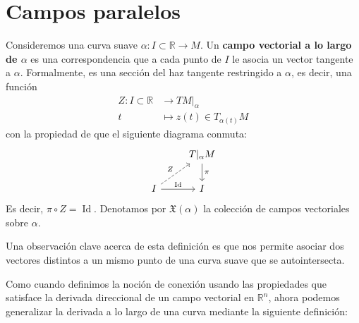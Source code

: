 \documentclass[spanish]{book}
\theoremstyle{definition}
\newcommand{\R}{\mathbb{R}}
\newcommand{\X}{\mathfrak{X}}
\DeclareMathOperator{\Id}{Id}
\begin{document}
	\section{Campos paralelos}
	Consideremos una curva suave $\alpha:I\subset\R\to M$. Un \textbf{campo vectorial a lo largo de $\alpha$} es una correspondencia que a cada punto de $I$ le asocia un vector tangente a $\alpha$. Formalmente, es una sección del haz tangente restringido a $\alpha$, es decir, una función
	\begin{align*}
		Z:I\subset\R&\to TM|_{\alpha}\\
		t&\mapsto z(t)\in T_{\alpha(t)}M
	\end{align*}
	con la propiedad de que el siguiente diagrama conmuta:
	\[\begin{tikzcd}
		&T|_{\alpha}M\arrow{d}{\pi}\\
		I\arrow{r}{\Id}\arrow[dashed]{ur}{Z}&I
	\end{tikzcd}\]
	Es decir, $\pi\circ Z=\Id$. Denotamos por $\X(\alpha)$ la colección de campos vectoriales sobre $\alpha$.
	
	Una observación clave acerca de esta definición es que nos permite asociar dos vectores distintos a un mismo punto de una curva suave que se autointersecta.
	
	Como cuando definimos la noción de conexión usando las propiedades que satisface la derivada direccional de un campo vectorial en $\R^n$, ahora podemos generalizar la derivada a lo largo de una curva mediante la siguiente definición:
	
\end{document}

